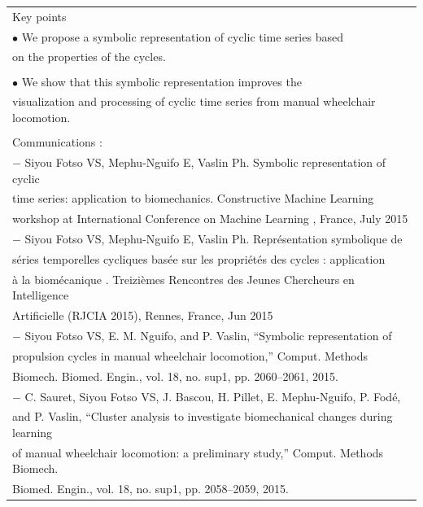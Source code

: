  
 \begin{table}[ht]
\centering
\begin{tabular}{|l|}

\hline
\rowcolor{LavenderBlush}
Key points\\
$\bullet$ We propose a symbolic representation of cyclic time series based \\ on the properties of the cycles. \\
\\
$\bullet$ We show that this symbolic representation improves the \\ visualization and processing of cyclic time series from manual wheelchair locomotion.\\ 
\\
Communications :\\
$-$ Siyou Fotso VS, Mephu-Nguifo E, Vaslin Ph. Symbolic representation of cyclic\\ time series: application to biomechanics. Constructive Machine Learning \\workshop at International Conference on Machine Learning , France, July 2015\\

$-$ Siyou Fotso VS, Mephu-Nguifo E, Vaslin Ph. Représentation symbolique de \\ séries temporelles cycliques basée sur les propriétés des cycles : application \\ à la biomécanique . Treizièmes Rencontres des Jeunes Chercheurs en Intelligence \\ Artificielle (RJCIA 2015), Rennes, France, Jun 2015\\

$-$ Siyou Fotso VS, E. M. Nguifo, and P. Vaslin, “Symbolic representation of \\propulsion cycles in manual wheelchair locomotion,” Comput. Methods \\ Biomech. Biomed. Engin., vol. 18, no. sup1, pp. 2060–2061, 2015.\\

$-$ C. Sauret, Siyou Fotso VS, J. Bascou, H. Pillet, E. Mephu-Nguifo, P. Fodé, \\and P. Vaslin, “Cluster analysis to investigate biomechanical changes during learning \\ of manual wheelchair locomotion: a preliminary study,” Comput. Methods Biomech.\\ Biomed. Engin., vol. 18, no. sup1, pp. 2058–2059, 2015.\\

 
\hline
\end{tabular}
\end{table}